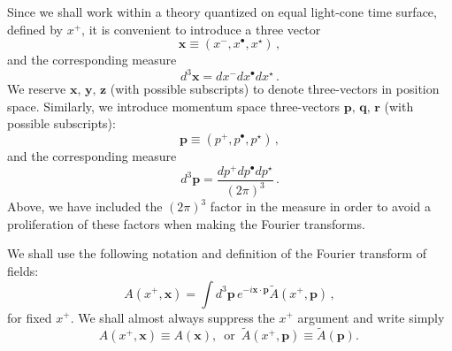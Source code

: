 \documentclass[english,american]{article}
\begin{document}
Since we shall work within a theory quantized on equal light-cone
time surface, defined by $x^{+}$, it is convenient to introduce a three
vector
\begin{equation}
\mathbf{x}\equiv\left(x^{-},x^{\bullet},x^{\star}\right)\, ,
\end{equation}
and the corresponding measure
\begin{equation}
d^{3}\mathbf{x}=dx^{-}dx^{\bullet}dx^{\star}\,.
\end{equation}
We reserve $\mathbf{x},\,\mathbf{y},\,\mathbf{z}$ (with possible
subscripts) to denote three-vectors in position space. Similarly,
we introduce momentum space three-vectors $\mathbf{p},\,\mathbf{q},\,\mathbf{r}$
(with possible subscripts):
\begin{equation}
\mathbf{p}\equiv\left(p^{+},p^{\bullet},p^{\star}\right)\, ,
\end{equation}
and the corresponding measure
\begin{equation}
d^{3}\mathbf{p}=\frac{dp^{+}dp^{\bullet}dp^{\star}}{\left(2\pi\right)^{3}}\,.
\end{equation}
Above, we have included the $\left(2\pi\right)^{3}$ factor in the
measure in order to avoid a proliferation of these factors when making
the Fourier transforms.

We shall use the following notation and definition of the Fourier
transform of fields:
\begin{equation}
A\left(x^{+},\mathbf{x}\right)=\int d^{3}\mathbf{p}\, e^{-i\mathbf{x}\cdot\mathbf{p}}\tilde{A}\left(x^{+},\mathbf{p}\right)\,,\label{eq:FT_def}
\end{equation}
for fixed $x^{+}$. We shall almost always suppress the $x^{+}$ argument
and write simply
\begin{equation}
A\left(x^{+},\mathbf{x}\right)\equiv A\left(\mathbf{x}\right),\,\,\,\textrm{or}\,\,\,\tilde{A}\left(x^{+},\mathbf{p}\right)\equiv\tilde{A}\left(\mathbf{p}\right).\,
\end{equation}
\end{document}
